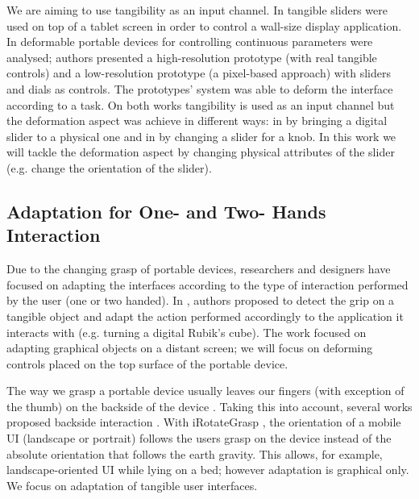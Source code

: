 \documentclass{sigchi}
\begin{document}
We are aiming to use tangibility as an input channel. In \cite{Jansen:2012:TRC:2207676.2208691} tangible sliders were used on top of a tablet screen in order to control a wall-size display application. In \cite{unpublished} deformable portable devices for controlling continuous parameters were analysed; authors presented a high-resolution prototype (with real tangible controls) and a low-resolution prototype (a pixel-based approach) with sliders and dials as controls. The prototypes’ system was able to deform the interface according to a task. On both works tangibility is used as an input channel but the deformation aspect was achieve in different ways: in \cite{Jansen:2012:TRC:2207676.2208691} by bringing a digital slider to a physical one and in \cite{unpublished} by changing a slider for a knob. In this work we will tackle the deformation aspect by changing physical attributes of the slider (e.g. change the orientation of the slider).

\subsection{Adaptation for One- and Two- Hands Interaction}
Due to the changing grasp of portable devices, researchers and designers have focused on adapting the interfaces according to the type of interaction performed by the user (one or two handed). In \cite{Taylor:2009:GGU:1518701.1518842}, authors proposed to detect the grip on a tangible object and adapt the action performed accordingly to the application it interacts with (e.g. turning a digital Rubik’s cube). The work focused on adapting graphical objects on a distant screen; we will focus on deforming controls placed on the top surface of the portable device.

The way we grasp a portable device usually leaves our fingers (with exception of the thumb) on the backside of the device \cite{hoober13}. Taking this into account, several works proposed backside interaction \cite{Baudisch:2009:BIA:1518701.1518995,Wigdor:2007:LTS:1294211.1294259}. With iRotateGrasp \cite{Cheng:2012:IGA:2380296.2380305}, the orientation of a mobile UI (landscape or portrait) follows the users grasp on the device instead of the absolute orientation that follows the earth gravity. This allows, for example, landscape-oriented UI while lying on a bed; however adaptation is graphical only. We focus on adaptation of tangible user interfaces.  
\end{document}
